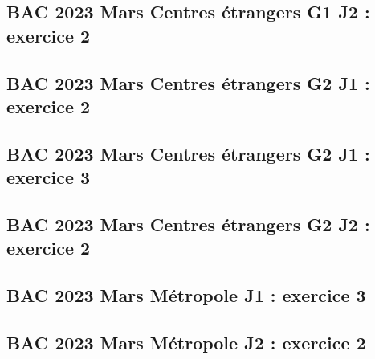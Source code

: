 \documentclass[lang=fr,edition=teacher,layout=sheet]{mxbook}
\begin{document}
\begingroup\endgroup
\par\bigskip
{}\subsection*{BAC 2023 Mars Centres étrangers G1 J2 : exercice 2}
\begingroup\endgroup
\par\bigskip
{}\subsection*{BAC 2023 Mars Centres étrangers G2 J1 : exercice 2}
\begingroup\endgroup
\par\bigskip
{}\subsection*{BAC 2023 Mars Centres étrangers G2 J1 : exercice 3}
\begingroup\endgroup
\par\bigskip
{}\subsection*{BAC 2023 Mars Centres étrangers G2 J2 : exercice 2}
\begingroup\endgroup
\par\bigskip
{}\subsection*{BAC 2023 Mars Métropole J1 : exercice 3}
\begingroup\endgroup
\par\bigskip
{}\subsection*{BAC 2023 Mars Métropole J2 : exercice 2}
\begingroup\endgroup
\end{document}
